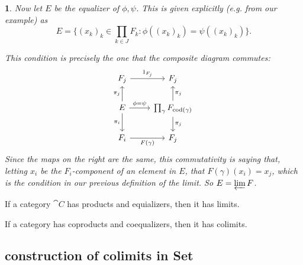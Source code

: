 \documentclass[12pt]{article}
\newtheorem{para}[theorem]{}
\begin{document}
\begin{para}
	Now let $E$ be the equalizer of $\phi,\psi$. This is given explicitly (e.g. from our example) as 
	\begin{equation*}
		E = \{(x_k)_k\in\prod_{k\in J} F_k : \phi((x_k)_k)=\psi((x_k)_k)\}.
	\end{equation*}
	
	This condition is precisely the one that the composite diagram commutes:
	\begin{equation*}
\begin{tikzcd}
F_j \arrow[r, "1_{F_j}"]                                        & F_j                                                                        \\
E \arrow[d, "\pi_i"'] \arrow[u, "\pi_j"] \arrow[r, "\phi=\psi"] & \prod_\gamma F_{\text{cod}(\gamma)} \arrow[d, "\pi_j"] \arrow[u, "\pi_j"'] \\
F_i \arrow[r, "F(\gamma)"']                                     & F_j                                                                       
\end{tikzcd}
	\end{equation*}
	Since the maps on the right are the same, this commutativity is saying that, letting $x_i$ be the $F_i$-component of an element in $E$, that $F(\gamma)(x_i)=x_j$, which is the condition in our previous definition of the limit. So $E=\varprojlim F$.
\end{para}

\begin{theorem}
	If a category $\cat{C}$ has products and equializers, then it has limits.
\end{theorem}

\begin{theorem}
	If a category has coproducts and coequalizers, then it has colimits.
\end{theorem}


\subsection{construction of colimits in Set} %
\end{document}
